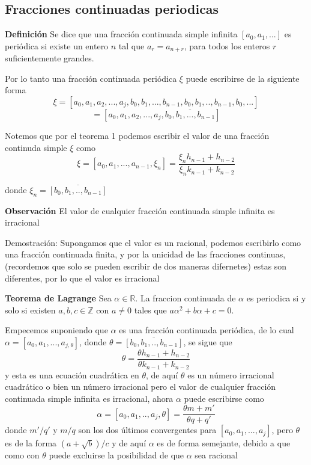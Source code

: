 \documentclass[11pt, article]{article}
\begin{document}
    \subsection*{Fracciones continuadas periodicas}
    
    \textbf{Definición} Se dice que una fracción continuada simple infinita $[a_0,a_1,...]$ es periódica si existe un entero $n$ tal que $a_r=a_{n+r}$, para todos los enteros $r$ suficientemente grandes.
    
    Por lo tanto una fracción continuada periódica $\xi$ puede escribirse de la siguiente forma
        \[\xi=
        [a_0,a_1,a_2,...,a_j,b_0,b_1,...,b_{n-1},b_0,b_1,..,b_{n-1},b_{0},...]
        \]
        \[
        =[a_0,a_1,a_2,...,a_j,\overline{b_0,b_1,...,b_{n-1}}]
        \]
    
    Notemos que por el teorema 1 podemos escribir el valor de una fracción continuda simple $\xi$ como 
    \[
    \xi=[a_0,a_1,...,a_{n-1},\xi_n]=\dfrac{\xi_n h_{n-1} + h_{n-2}}{\xi_n k_{n-1} + k_{n-2}}
    \]
    
    donde $\xi_n=\overline{[b_0,b_1,..,b_{n-1}]}$
    
    \textbf{Observación} El valor de cualquier fracción continuada simple infinita es irracional
    
    Demostración: Supongamos que el valor es un racional, podemos escribirlo como una fracción continuada finita, y por la unicidad de las fracciones continuas, (recordemos que solo se pueden escribir de dos maneras difernetes)  estas son diferentes, por lo que el valor es irracional
    
    

    \textbf{Teorema de Lagrange} Sea $\alpha \in \mathbb{R}$. La fraccion continuada de $\alpha$ es periodica si y solo si existen $a, b, c \in\mathbb{Z}$ con $a\not=0$ tales que $a\alpha^2 + b\alpha + c = 0$.

    Empecemos suponiendo que $\alpha$ es una fracción continuada periódica, de lo cual $\alpha= [a_0,a_1,...,a_{j,\theta}]$, donde $\theta=\overline{[b_0,b_1,..,b_{n-1}]}$, se sigue que
        \[
        \theta =\dfrac{\theta h_{n-1}+h_{n-2}}{\theta k_{n-1}+k_{n-2}}
        \]
    y esta es una ecuación cuadrática en $\theta$, de aquí $\theta$ es un número irracional cuadrático o bien un número irracional pero el valor de cualquier fracción continuada simple infinita es irracional, ahora $\alpha$ puede escribirse como 
        \[
        \alpha = [a_0,a_1,..,a_j,\theta]=\dfrac{\theta m + m'}{\theta q + q'}
        \]
    donde $m'/q'$ y $m/q$ son los dos últimos convergentes para $[a_0,a_1,...,a_j]$, pero $\theta$ es de la forma $(a + \sqrt{b})/c$ y de aquí $\alpha$ es de forma semejante, debido a que como con $\theta$ puede excluirse la posibilidad de que $\alpha$ sea racional
\end{document}
